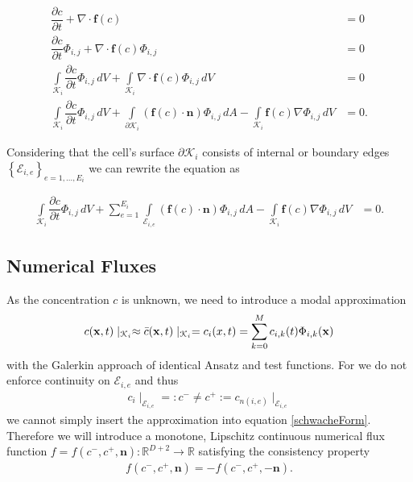		\begin{align*}
			\dfrac{\partial c}{\partial t} + \nabla \cdot \boldsymbol{f}(c) &= 0 \\
			\dfrac{\partial c}{\partial t}\Phi_{i,j} + \nabla \cdot \boldsymbol{f}(c)\Phi_{i,j} &= 0 \\
			\int\limits_{\mathcal{K}_i} \dfrac{\partial c}{\partial t}\Phi_{i,j} \, dV + \int\limits_{\mathcal{K}_i}\nabla \cdot \boldsymbol{f}(c)\Phi_{i,j} \, dV &= 0\\
			\int\limits_{\mathcal{K}_i} \dfrac{\partial c}{\partial t}\Phi_{i,j} \, dV +
			\int\limits_{\partial \mathcal{K}_i} \left(\boldsymbol{f} \left( c \right) \cdot \boldsymbol{n} \right)\Phi_{i,j} \, dA
			- \int\limits_{\mathcal{K}_i} \boldsymbol{f}\left(c\right)\nabla\Phi_{i,j} \, dV &= 0.
		\end{align*}
		
		Considering that the cell's surface $\partial \mathcal{K}_i$ consists of internal or boundary edges $\left\{\mathcal{E}_{i,e}\right\}_{e = 1,...,E_i}$ we can rewrite the equation as
		
		\begin{align}
				\int\limits_{\mathcal{K}_i} \dfrac{\partial c}{\partial t}\Phi_{i,j} \, dV +
				\sum_{e=1}^{E_i}\int\limits_{\mathcal{E}_{i,e}} \left(\boldsymbol{f} \left( c \right) \cdot \boldsymbol{n} \right)\Phi_{i,j} \, dA
				- \int\limits_{\mathcal{K}_i} \boldsymbol{f}\left(c\right)\nabla\Phi_{i,j} \, dV &= 0.
				\label{schwacheForm}
		\end{align}
				
		\subsection{Numerical Fluxes}
		
		As the concentration $c$ is unknown, we need to introduce a modal approximation
		\begin{align}
			c(\mathbf{x} , t)\mid _{\mathcal{K}_i} \approx \bar{c} (\mathbf{x} , t)\mid _{\mathcal{K}_i} = c_i (\boldmath{x} , t) = \sum_{k = 0}^{M}c_{i,k}(t) \Phi_{i,k}(\mathbf{x})
		\end{align}
		with the Galerkin approach of identical Ansatz and test functions. 
		For we do not enforce continuity on $\mathcal{E}_{i,e}$ and thus 
		\begin{align}
			c_i \mid_{\mathcal{E}_{i,e}}=: c^- \neq c^+ := c_{n(i,e)} \mid_{\mathcal{E}_{i,e}}
		\end{align}
		we cannot simply insert the approximation into equation \eqref{schwacheForm}.
		Therefore we will introduce a monotone, Lipschitz continuous numerical flux function $f = f(c^-, c^+, \mathbf{n}):\mathbb{R}^{D+2}\rightarrow\mathbb{R}$ satisfying the consistency property
		\begin{align}
			f(c^-, c^+, \mathbf{n}) = - f(c^-, c^+, -\mathbf{n}).
		\end{align}
		
